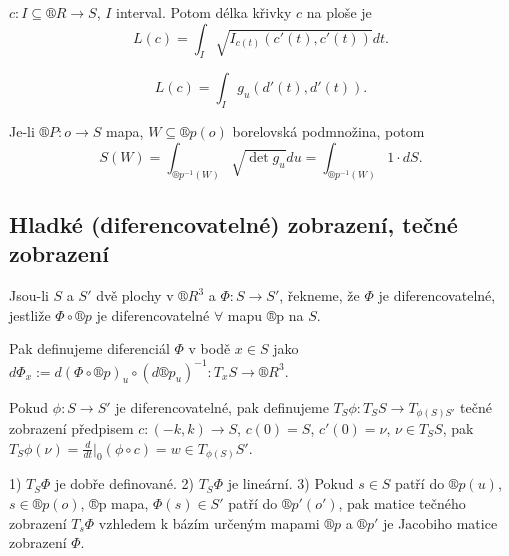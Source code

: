 \documentclass[12pt]{article}                   %
\begin{document}
    \begin{dusledek}
        $c: I \subseteq ®R \rightarrow S$, $I$ interval. Potom délka křivky $c$ na ploše je
        $$ L(c) = \int_I \sqrt{I_{c(t)}(c'(t), c'(t))}dt. $$
    \end{dusledek}

    \begin{lemma}
        $$ L(c) = \int_I g_u (d'(t), d'(t)). $$
    \end{lemma}

    \begin{lemma}
        Je-li $®P: o \rightarrow S$ mapa, $W \subseteq ®p(o)$ borelovská podmnožina, potom
        $$ S(W) = \int_{®p^{-1}(W)} \sqrt{\det g_u} du = \int_{®p^{-1}(W)} 1·dS. $$
    \end{lemma}

    \subsection{Hladké (diferencovatelné) zobrazení, tečné zobrazení}
        \begin{definice}
            Jsou-li $S$ a $S'$ dvě plochy v $®R^3$ a $\Phi: S \rightarrow S'$, řekneme, že $\Phi$ je diferencovatelné, jestliže $\Phi \circ ®p$ je diferencovatelné $\forall$ mapu ®p na $S$.

            Pak definujeme diferenciál $\Phi$ v bodě $x \in S$ jako $d\Phi_x := d(\Phi \circ ®p)_u \circ (d®p_u)^{-1}: T_xS \rightarrow ®R^3$.
        \end{definice}

    
        \begin{definice}
            Pokud $\phi: S \rightarrow S'$ je diferencovatelné, pak definujeme $T_S \phi: T_SS \rightarrow T_{\phi(S)S'}$ tečné zobrazení předpisem $c:(-k, k) \rightarrow S$, $c(0) = S$, $c'(0) = \nu$, $\nu \in T_SS$, pak $T_S\phi(\nu) = \frac{d}{dt}|_0 (\phi \circ c) = w \in T_{\phi(S)}S'$.
        \end{definice}

        \begin{lemma}
            1) $T_S \Phi$ je dobře definované. 2) $T_S \Phi$ je lineární. 3) Pokud $s \in S$ patří do $®p(u)$, $s \in ®p(o)$, ®p mapa, $\Phi(s) \in S'$ patří do $®p'(o')$, pak matice tečného zobrazení $T_s \Phi$ vzhledem k bázím určeným mapami $®p$ a $®p'$ je Jacobiho matice zobrazení $\Phi$.
        \end{lemma}
\end{document}
